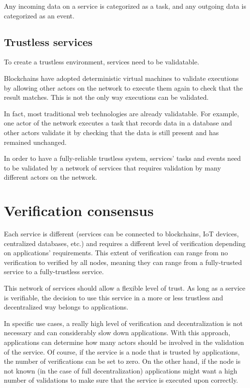 \documentclass{article}
\begin{document}
Any incoming data on a service is categorized as a task, and any outgoing data is categorized as an event.

\subsection{Trustless services}

To create a trustless environment, services need to be validatable. 

Blockchains have adopted deterministic virtual machines to validate executions by allowing other actors on the network to execute them again to check that the result matches. This is not the only way executions can be validated.

In fact, most traditional web technologies are already validatable. For example, one actor of the network executes a task that records data in a database and other actors validate it by checking that the data is still present and has remained unchanged.

In order to have a fully-reliable trustless system, services’ tasks and events need to be validated  by a network of services that requires validation by many different actors on the network.

\section{Verification consensus}

Each service is different (services can be connected to blockchains, IoT devices, centralized databases, etc.) and requires a different level of verification depending on applications’ requirements. This extent of verification can range from no verification to verified by all nodes, meaning they can range from a fully-trusted service to a fully-trustless service.

This network of services should allow a flexible level of trust. As long as a service is verifiable, the decision to use this service in a more or less trustless and decentralized way belongs to applications.

In specific use cases, a really high level of verification and decentralization is not necessary and can considerably slow down applications. With this approach, applications can determine how many actors should be involved in the validation of the service. Of course, if the service is a node that is trusted by applications, the number of verifications can be set to zero. On the other hand, if the node is not known (in the case of full decentralization) applications might want a high number of validations to make sure that the service is executed upon correctly.
\end{document}
